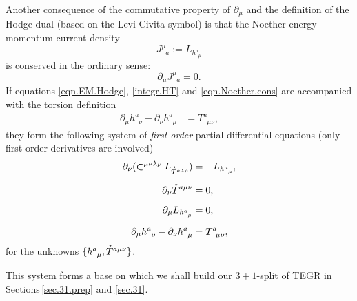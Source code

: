 \documentclass[
10pt, %
a4paper, %
oneside, %
twocolumn,
headinclude,footinclude, %
BCOR5mm, %
]{scrartcl}
\newcommand{\pd}[1]{\partial_{#1}}
\newcommand{\tetrsymbol}{h}
\newcommand{\tetr}[2]{\tetrsymbol^{#1}_{\phantom{#1}#2}}
\newcommand{\D}[1]{\partial_{#1}} %
\newcommand{\Tors}[2]{T^{#1}_{\phantom{#1}#2}}
\newcommand{\Laghodge}{L}%
\newcommand{\LCsymb}{\bm{\in}}    %
\newcommand{\HDT}[1]{\accentset{\star}{T}^{#1}}
\newcommand{\NC}[2]{J^{#2}_{\phantom{#2}#1}}
\begin{document}
	Another consequence of the commutative property of $ \pd{\mu} $ and the definition of the Hodge 
	dual (based on the Levi-Civita symbol) is that the Noether energy-momentum 
	current density
	\begin{equation}\label{eqn.Noether.current}
		\NC{a}{\mu} := \Laghodge_{\tetr{a}{\mu}}
	\end{equation}
	is conserved in the ordinary sense:
	\begin{equation}\label{eqn.Noether.cons}
		\D{\mu} \NC{a}{\mu} = 0.
	\end{equation}
	If  equations \eqref{eqn.EM.Hodge}, \eqref{integr.HT} and \eqref{eqn.Noether.cons} are 
	accompanied 
	with the 
	torsion definition
	\begin{subequations}
		\begin{align}\label{eqn.tetr}
			\D{\mu}\tetr{a}{\nu} - \D{\nu}\tetr{a}{\mu} &= \Tors{a}{\mu\nu},
			\qquad
		\end{align}	
	\end{subequations}
	they form the following system of \emph{first-order} partial differential
	equations (only first-order derivatives are involved)
	\begin{subequations}\label{eqn.1st.order.TEGR}
		\begin{align}	
			\D{\nu}(\LCsymb^{\mu\nu\lambda\rho}\Laghodge_{\HDT{a\lambda\rho}}) 
			&=-\Laghodge_{\tetr{a}{\mu}},\label{eqn.TEGR0.EL}\\[2mm]
			\D{\nu}\HDT{a\mu\nu} & = 0,\label{eqn.TEGR0.integr}\\[2mm]
			\D{\mu}\Laghodge_{\tetr{a}{\mu}} & = 0,\label{eqn.TEGR0.enermomen}\\[2mm]
			\D{\mu}\tetr{a}{\nu} - \D{\nu}\tetr{a}{\mu} &= \Tors{a}{\mu\nu},\label{eqn.TEGR0.tetrad}
		\end{align}
	\end{subequations}
	for the unknowns $ \{\tetr{a}{\mu},\HDT{a\mu\nu}\} $.
	
	This system forms a base on which we shall build our $ 3+1 $-split of TEGR in 
	Sections\,\ref{sec.31.prep} and \ref{sec.31}.
	
	
	
	
	
\end{document}
